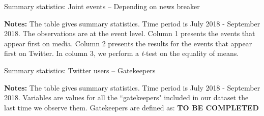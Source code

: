 %


\begin{table}
\caption{Summary statistics: Joint events -- Depending on news breaker\label{Tab:table_summary_joint_events_ttest}}
\begin{center}

\end{center}
\begin{spacing}{0.5}
{\fns \textbf{Notes:} The table gives summary statistics. Time period is July 2018 - September 2018. The observations are at the event level.  Column 1 presents the events that appear first on media. Column 2 presents the results for the events that appear first on Twitter. In column 3, we perform a \textit{t}-test on the equality of means.}
\end{spacing}
\end{table} 


\begin{table}
\caption{Summary statistics: Twitter users -- Gatekeepers}
\begin{center}
	
\end{center}
\begin{spacing}{0.5}
	{\fns \textbf{Notes:} The table gives summary statistics. Time period is July 2018 - September 2018. Variables are values for all the ``gatekeepers" included in our dataset the last time we observe them. Gatekeepers are defined as: \textbf{TO BE COMPLETED}} 
\end{spacing}
\label{Tab:table_summary_gatekeepers}
\end{table} 

